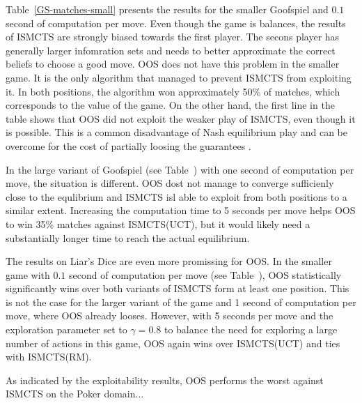 \documentclass{aamas2015}
\begin{document}
Table~\ref{GS-matches-small} presents the results for the smaller Goofspiel and $0.1$ second of computation per move. Even though the game is balances, the results of ISMCTS are strongly biased towards the first player. The secons player has generally larger infomration sets and needs to better approximate the correct beliefs to choose a good move. OOS does not have this problem in the smaller game. It is the only algorithm that managed to prevent ISMCTS from exploiting it.
In both positions, the algorithm won approximately 50\% of matches, which corresponds to the value of the game.
On the other hand, the first line in the table shows that OOS did not exploit the weaker play of ISMCTS, even though it is possible. This is a common disadvantage of Nash equilibrium play \cite{} and can be overcome for the cost of partially loosing the guarantees \cite{RNR}.

In the large variant of Goofspiel (see Table~\cite{GS-matches-small}) with one second of computation per move, the situation is different. OOS dost not manage to converge sufficienly close to the equlibrium and ISMCTS isl able to exploit from both positions to a similar extent. Increasing the computation time to 5 seconds per move helps OOS to win 35\% matches against ISMCTS(UCT), but it would likely need a substantially longer time to reach the actual equilibrium.

The results on Liar's Dice are even more promissing for OOS. In the smaller game with $0.1$ second of computation per move (see Table~\cite{LD-matches-small}), OOS statistically significantly wins over both variants of ISMCTS form at least one position. This is not the case for the larger variant of the game and 1 second of computation per move, where OOS already looses. However, with 5 seconds per move and the exploration parameter set to $\gamma=0.8$ to balance the need for exploring a large number of actions in this game, OOS again wins over ISMCTS(UCT) and ties with ISMCTS(RM).

As indicated by the exploitability results, OOS performs the worst against ISMCTS on the Poker domain...


\end{document}
